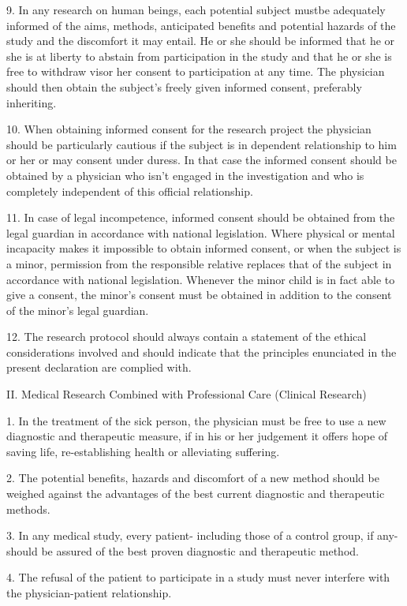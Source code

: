 {{ 9. In any research on human beings, each potential subject mustbe adequately informed of the aims, methods, anticipated benefits and potential hazards of the study and the discomfort it may entail. He or she should be informed that he or she is at liberty to abstain from participation in the study and that he or she is free to withdraw visor her consent to participation at any time. The physician should then obtain the subject's freely given informed consent, preferably inheriting.

 10. When obtaining informed consent for the research project the physician should be particularly cautious if the subject is in dependent relationship to him or her or may consent under duress. In that case the informed consent should be obtained by a physician who isn't engaged in the investigation and who is completely independent of this official relationship.

 11. In case of legal incompetence, informed consent should be obtained from the legal guardian in accordance with national legislation. Where physical or mental incapacity makes it impossible to obtain informed consent, or when the subject is a minor, permission from the responsible relative replaces that of the subject in accordance with national legislation. Whenever the minor child is in fact able to give a consent, the minor's consent must be obtained in addition to the consent of the minor's legal guardian.

 12. The research protocol should always contain a statement of the ethical considerations involved and should indicate that the principles enunciated in the present declaration are complied with.

II. Medical Research Combined with Professional Care (Clinical Research)

 1. In the treatment of the sick person, the physician must be free to use a new diagnostic and therapeutic measure, if in his or her judgement it offers hope of saving life, re-establishing health or alleviating suffering.

 2. The potential benefits, hazards and discomfort of a new method should be weighed against the advantages of the best current diagnostic and therapeutic methods.

 3. In any medical study, every patient- including those of a control group, if any- should be assured of the best proven diagnostic and therapeutic method.

 4. The refusal of the patient to participate in a study must never interfere with the physician-patient relationship.

}}
